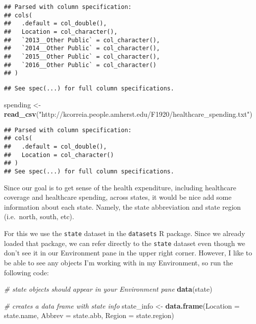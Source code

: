 \documentclass[
]{article}
\newenvironment{Shaded}{\begin{snugshade}}{\end{snugshade}}
\newcommand{\CommentTok}[1]{\textcolor[rgb]{0.56,0.35,0.01}{\textit{#1}}}
\newcommand{\DataTypeTok}[1]{\textcolor[rgb]{0.13,0.29,0.53}{#1}}
\newcommand{\KeywordTok}[1]{\textcolor[rgb]{0.13,0.29,0.53}{\textbf{#1}}}
\newcommand{\NormalTok}[1]{#1}
\newcommand{\StringTok}[1]{\textcolor[rgb]{0.31,0.60,0.02}{#1}}
\begin{document}
\begin{verbatim}
## Parsed with column specification:
## cols(
##   .default = col_double(),
##   Location = col_character(),
##   `2013__Other Public` = col_character(),
##   `2014__Other Public` = col_character(),
##   `2015__Other Public` = col_character(),
##   `2016__Other Public` = col_character()
## )
\end{verbatim}

\begin{verbatim}
## See spec(...) for full column specifications.
\end{verbatim}

\begin{Shaded}
\begin{Highlighting}[]
\NormalTok{spending <-}\StringTok{ }\KeywordTok{read_csv}\NormalTok{(}\StringTok{"http://kcorreia.people.amherst.edu/F1920/healthcare_spending.txt"}\NormalTok{)}
\end{Highlighting}
\end{Shaded}

\begin{verbatim}
## Parsed with column specification:
## cols(
##   .default = col_double(),
##   Location = col_character()
## )
## See spec(...) for full column specifications.
\end{verbatim}

Since our goal is to get sense of the health expenditure, including
healthcare coverage and healthcare spending, across states, it would be
nice add some information about each state. Namely, the state
abbreviation and state region (i.e.~north, south, etc).

For this we use the \texttt{state} dataset in the \texttt{datasets} R
package. Since we already loaded that package, we can refer directly to
the \texttt{state} dataset even though we don't see it in our
Environment pane in the upper right corner. However, I like to be able
to see any objects I'm working with in my Environment, so run the
following code:

\begin{Shaded}
\begin{Highlighting}[]
\CommentTok{# state objects should appear in your Environment pane}
\KeywordTok{data}\NormalTok{(state) }

\CommentTok{# creates a data frame with state info}
\NormalTok{state_info <-}\StringTok{ }\KeywordTok{data.frame}\NormalTok{(}\DataTypeTok{Location =}\NormalTok{ state.name, }\DataTypeTok{Abbrev =}\NormalTok{ state.abb, }\DataTypeTok{Region =}\NormalTok{ state.region)}
\end{Highlighting}
\end{Shaded}
\end{document}
